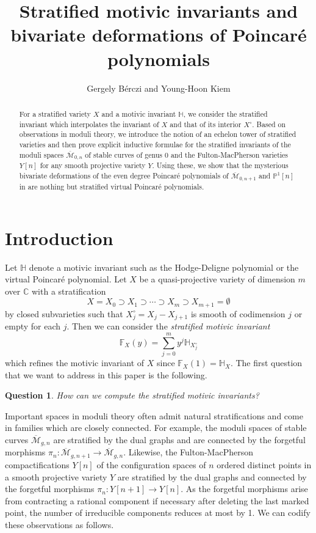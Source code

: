\documentclass[11pt]{amsart}
\title{Stratified motivic invariants and bivariate deformations of Poincar\'e polynomials}
\author{Gergely B\'erczi and Young-Hoon Kiem}
\date{}
\newtheorem{question}[theorem]{Question}
\newcommand{\Mbarzn}{\overline{\mathcal M}_{0,n}}
\newcommand{\Mbargn}{\overline{\mathcal M}_{g,n}}
\newcommand{\PP}{\mathbb{P}}
\newcommand{\cM}{\mathcal{M}}
\newcommand{\bcM}{\overline{\cM}}
\def\cM{\mathcal{M}}
\def\CC{\mathbb{C}}
\def\beq{\begin{equation}}
\def\eeq{\end{equation}}
\def\HH{\mathbb{H}}
\def\FF{\mathbb{F}}
\begin{document}
\begin{abstract}
    For a stratified variety $X$ and a motivic invariant $\HH$, we consider the stratified invariant which interpolates the invariant of $X$ and that of its interior $X^\circ$. Based on observations in moduli theory, we introduce the notion of an echelon tower of stratified varieties and then prove explicit inductive formulae for the stratified invariants of the moduli spaces $\Mbarzn$ of stable curves of genus $0$ and the Fulton-MacPherson varieties $Y[n]$ for any smooth projective variety $Y$. Using these, we show that the mysterious bivariate deformations of the even degree Poincar\'e polynomials of $\bcM_{0,n+1}$ and $\PP^1[n]$ in \cite{BercziKiem2026} are nothing but stratified virtual Poincar\'e polynomials.    
\end{abstract}

\maketitle

\section{Introduction}

Let $\HH$ denote a motivic invariant such as the Hodge-Deligne polynomial or the virtual Poincar\'e polynomial. Let $X$ be a quasi-projective variety of dimension $m$ over $\CC$ with a stratification 
$$X=X_0\supset X_1\supset \cdots \supset X_m\supset X_{m+1}=\emptyset$$
by closed subvarieties such that $X_j^\circ=X_j-X_{j+1}$ is smooth of codimension $j$ or empty for each $j$. Then we can consider the \emph{stratified motivic invariant}
\beq\label{i3} \FF_X(y)=\sum_{j=0}^m y^j\HH_{X_j^\circ}\eeq 
which refines the motivic invariant of $X$ since $\FF_X(1)=\HH_X$. 
The first question that we want to address in this paper is the following.

\begin{question}
    How can we compute the stratified motivic invariants?
\end{question}

Important spaces in moduli theory often admit natural stratifications and come in families which are closely connected. For example, the moduli spaces of stable curves $\Mbargn$ are stratified by the dual graphs and are connected by the forgetful morphisms $\pi_n:\bcM_{g,n+1}\to \Mbargn$. Likewise, the Fulton-MacPherson compactifications $Y[n]$ of the configuration spaces of $n$ ordered distinct points in a smooth projective variety $Y$ are stratified by the dual graphs and connected by the forgetful morphisms $\pi_n:Y[n+1]\to Y[n]$.
As the forgetful morphisms arise from contracting a rational component if necessary after deleting the last marked point, the number of irreducible components reduces at most by 1. 
We can codify these observations as follows.
\end{document}
